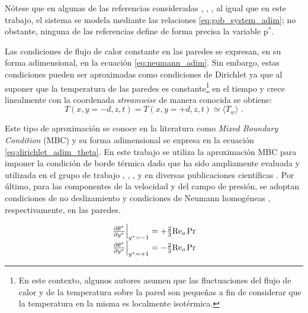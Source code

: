 Nótese que en algunas de las referencias consideradas \cite{guo2022direct}, \cite{zhou2024direct}, \cite{tao1960}, al igual que en este trabajo, el sistema se modela \linebreak mediante las relaciones \ref{eq:gob_system_adim}; no obstante, ninguna de las referencias define de forma precisa la variable $\text{p}^*$.

Las condiciones de flujo de calor constante en las paredes se expresan, en su forma adimensional, en la ecuación \ref{eq:neumann_adim}. Sin embargo, estas condiciones pueden ser \linebreak aproximadas como condiciones de Dirichlet ya que al suponer que la temperatura de las paredes es constante\footnote{En este contexto, algunos autores \cite{kasagi1992direct,tao1960} asumen que las fluctuaciones del flujo de calor y de la temperatura sobre la pared son pequeñas a fin de considerar que la temperatura en la misma es localmente isotérmica.} en el tiempo y crece linealmente con la coordenada \textit{streamwise} de manera conocida se obtiene:
$$T(x,y=-d,z,t) = T(x,y=+d,z,t) \simeq \langle T_w \rangle \text{ .} $$

Este tipo de aproximación se conoce en la literatura como \textit{Mixed Boundary \linebreak Condition} (MBC) \cite{straub2019influence} y su forma adimensional se expresa en la ecuación \ref{eq:dirichlet_adim_theta}. En este trabajo se utiliza la aproximación MBC para imponer la condición de borde térmica dado que ha sido ampliamente evaluada y utilizada en el grupo de trabajo \cite{abregu2023dns}, \cite{szuban2023}, \cite{machaca2024}, y en diversas publicaciones científicas \cite{kawamura2000dns, kasagi1992direct}. Por último, para las componentes de la velocidad y del campo de presión, se adoptan condiciones de no deslizamiento y condiciones de Neumann homogéneas \cite{bartholomew2020xcompact3d}, respectivamente, en las paredes. 

\begin{align}
\begin{array}{l}
    \left. \frac{\partial \theta^*}{\partial y^*} \right\vert_{y^*=-1} = + \frac{2}{3} \text{Re}_o \hspace{0.5mm} \text{Pr} \\
    \left. \frac{\partial \theta^*}{\partial y^*} \right\vert_{y^*=+1} = - \frac{2}{3} \text{Re}_o \hspace{0.5mm} \text{Pr} 
\end{array}
\label{eq:neumann_adim}
\end{align}

